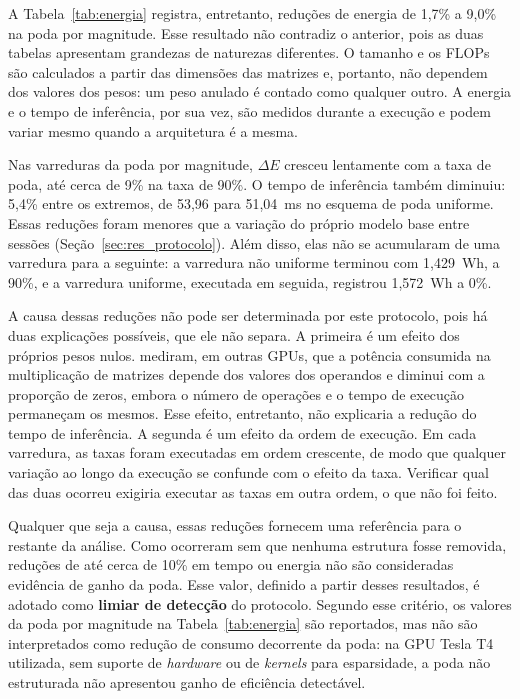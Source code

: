 A Tabela~\ref{tab:energia} registra, entretanto, reduções de energia de 1,7\% a 9,0\% na poda
por magnitude. Esse resultado não contradiz o anterior, pois as duas tabelas apresentam
grandezas de naturezas diferentes. O tamanho e os FLOPs são calculados a partir das dimensões
das matrizes e, portanto, não dependem dos valores dos pesos: um peso anulado é contado como
qualquer outro. A energia e o tempo de inferência, por sua vez, são medidos durante a execução
e podem variar mesmo quando a arquitetura é a mesma.

Nas varreduras da poda por magnitude, $\Delta E$ cresceu lentamente com a taxa de poda, até
cerca de 9\% na taxa de 90\%. O tempo de inferência também diminuiu: 5,4\% entre os extremos,
de 53,96 para 51,04~ms no esquema de poda uniforme. Essas reduções foram menores que a
variação do próprio modelo base entre sessões (Seção~\ref{sec:res_protocolo}). Além disso,
elas não se acumularam de uma varredura para a seguinte: a varredura não uniforme terminou
com 1,429~Wh, a 90\%, e a varredura uniforme, executada em seguida, registrou 1,572~Wh a 0\%.

A causa dessas reduções não pode ser determinada por este protocolo, pois há duas explicações
possíveis, que ele não separa. A primeira é um efeito dos próprios pesos nulos.
 mediram, em outras GPUs, que a potência consumida na multiplicação
de matrizes depende dos valores dos operandos e diminui com a proporção de zeros, embora o
número de operações e o tempo de execução permaneçam os mesmos. Esse efeito, entretanto, não
explicaria a redução do tempo de inferência. A segunda é um efeito da ordem de execução. Em
cada varredura, as taxas foram executadas em ordem crescente, de modo que qualquer variação
ao longo da execução se confunde com o efeito da taxa. Verificar qual das duas ocorreu
exigiria executar as taxas em outra ordem, o que não foi feito.

Qualquer que seja a causa, essas reduções fornecem uma referência para o restante da análise.
Como ocorreram sem que
nenhuma estrutura fosse removida, reduções de até cerca de 10\% em tempo ou energia não são
consideradas evidência de ganho da poda. Esse valor, definido a partir desses resultados, é
adotado como \textbf{limiar de detecção} do protocolo. Segundo esse critério, os valores da
poda por magnitude na Tabela~\ref{tab:energia} são reportados, mas não são interpretados como
redução de consumo decorrente da poda: na GPU Tesla T4 utilizada, sem suporte de
\textit{hardware} ou de \textit{kernels} para esparsidade, a poda não estruturada não
apresentou ganho de eficiência detectável.

